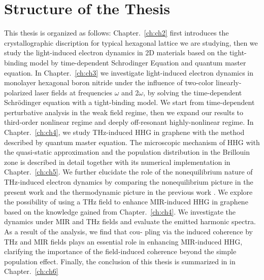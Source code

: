 \section{Structure of the Thesis}
This thesis is organized as follows: Chapter.~\ref{ch:ch2} first introduces the crystallographic discription
for typical hexagonal lattice we are studying, then we study the light-induced electron dynamics in 2D materials based on the tight-binding model by
time-dependent Schrodinger Equation and quantum master equation.
In Chapter.~\ref{ch:ch3} we investigate light-induced electron dynamics in monolayer hexagonal
boron nitride under the influence of two-color linearly-polarized laser fields at frequencies
$\omega$ and $2\omega$, by solving the time-dependent Schr\"odinger equation with a tight-binding
model. We start from time-dependent perturbative analysis in the weak field regime, then we expand
our results to third-order nonlinear regime and deeply off-resonant highly-nonlinear regime.
In Chapter.~\ref{ch:ch4}, we study THz-induced HHG in graphene with the method described by quantum
master equation. The microscopic mechanism of
HHG with the quasi-static approximation and the population distribution in the Brillouin zone is
described in detail together with its numerical implementation in Chapter.~\ref{ch:ch5}. We further elucidate the role of the nonequilibrium nature of THz-induced electron dynamics by comparing the nonequilibrium picture in the present work and the thermodynamic picture in the previous work \cite{mics2015thermodynamic}.
We explore the possibility of using a THz
field to enhance MIR-induced HHG in graphene based
on the knowledge gained from Chapter.~\ref{ch:ch4}. We investigate the dynamics under MIR and THz fields and evaluate the emitted harmonic spectra. As a result of the analysis, we find that cou- pling via the induced coherence by THz and MIR fields plays an essential role in enhancing MIR-induced HHG, clarifying the importance of the field-induced coherence beyond the simple population effect.
Finally, the conclusion of this thesis is summarized in in Chapter.~\ref{ch:ch6}
